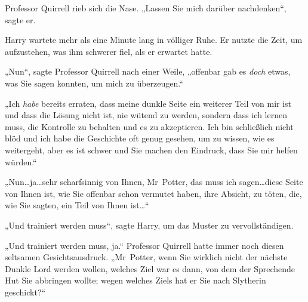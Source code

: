 Professor Quirrell rieb sich die Nase. „Lassen Sie mich darüber nachdenken“, sagte er.

Harry wartete mehr als eine Minute lang in völliger Ruhe. Er nutzte die Zeit, um aufzustehen, was ihm schwerer fiel, als er erwartet hatte.

„Nun“, sagte Professor Quirrell nach einer Weile, „offenbar gab es \emph{doch} etwas, was Sie sagen konnten, um mich zu überzeugen.“

„Ich \emph{habe} bereits erraten, dass meine dunkle Seite ein weiterer Teil von mir ist und dass die Lösung nicht ist, nie wütend zu werden, sondern dass ich lernen muss, die Kontrolle zu behalten und es zu akzeptieren. Ich bin schließlich nicht blöd und ich habe die Geschichte oft genug gesehen, um zu wissen, wie es weitergeht, aber es ist schwer und Sie machen den Eindruck, dass Sie mir helfen würden.“

„Nun…ja…sehr scharfsinnig von Ihnen, Mr~Potter, das muss ich sagen…diese Seite von Ihnen ist, wie Sie offenbar schon vermutet haben, ihre Absicht, zu töten, die, wie Sie sagten, ein Teil von Ihnen ist…“

„Und trainiert werden muss“, sagte Harry, um das Muster zu vervollständigen.

„Und trainiert werden muss, ja.“ Professor Quirrell hatte immer noch diesen seltsamen Gesichtsausdruck. „Mr~Potter, wenn Sie wirklich nicht der nächste Dunkle Lord werden wollen, welches Ziel war es dann, von dem der Sprechende Hut Sie abbringen wollte; wegen welches Ziels hat er Sie nach Slytherin geschickt?“

